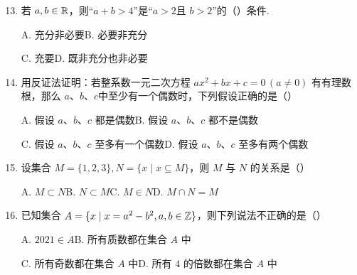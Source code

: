 \documentclass[a4paper,11pt]{article}
\begin{document}
\begin{enumerate}
\setcounter{enumi}{12}

\item 若 $a,b\in\mathbb{R}$，则“$a+b>4$”是“$a>2$且 $b>2$”的\mbox{（\quad）}条件.

\keepwithprev
A. 充分非必要\qquad B. 必要非充分

C. 充要\qquad D. 既非充分也非必要

\ifanswer
\solbegin
{}
\solend
\fi

\item 用反证法证明：若整系数一元二次方程 $ax^2+bx+c=0\,(a\neq0)$ 有有理数根，那么 $a$、$b$、$c$中至少有一个偶数时，下列假设正确的是\mbox{（\quad）}%

\keepwithprev
A. 假设 $a$、$b$、$c$ 都是偶数\qquad B. 假设 $a$、$b$、$c$ 都不是偶数

C. 假设 $a$、$b$、$c$ 至多有一个偶数\qquad D. 假设 $a$、$b$、$c$ 至多有两个偶数

\ifanswer
{}
\fi

\item 设集合 $M=\{1,2,3\},N=\{x\mid x\subseteq M\}$，则 $M$ 与 $N$ 的关系是\mbox{（\quad）}

\keepwithprev
A. $M\subset N$\qquad B. $N\subset M$\qquad C. $M\in N$\qquad D. $M\cap N=M$

\ifanswer
\solbegin
{}%
\solend
\fi

\item 已知集合 $A=\{x\mid x=a^2-b^2,a,b\in\mathbb{Z}\}$，则下列说法不正确的是\mbox{（\quad）}

\keepwithprev
A. $2021\in A$\qquad B. 所有质数都在集合 $A$ 中

C. 所有奇数都在集合 $A$ 中\qquad D. 所有 4 的倍数都在集合 $A$ 中

\ifanswer
\solbegin
{}
\solend
\fi

\end{enumerate}

\end{document}
